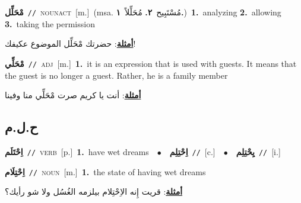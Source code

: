\documentclass[10pt,a4paper,twoside]{article} %
\begin{document}
\begin{multicols}{2}
{\setlength\topsep{0pt}\textbf{\foreignlanguage{arabic}{مْحَلِّل}}\ {\color{gray}\texttt{//}\color{black}}\ \textsc{noun\textunderscore act}\ [m.]\ \color{gray}(msa. \foreignlanguage{arabic}{مُسْتَبِيح}~\foreignlanguage{arabic}{\textbf{٢.}}  \foreignlanguage{arabic}{مُحَلِّلاً}~\foreignlanguage{arabic}{\textbf{١.}})\color{black}\ \textbf{1.}~analyzing  \textbf{2.}~allowing  \textbf{3.}~taking the permission\  \begin{flushright}\color{gray}\foreignlanguage{arabic}{\textbf{\underline{\foreignlanguage{arabic}{أمثلة}}}: حضرتك مْحَلِّل الموضوع عكيفك!}\end{flushright}\color{black}} \vspace{2mm}

{\setlength\topsep{0pt}\textbf{\foreignlanguage{arabic}{مْحَلِّي}}\ {\color{gray}\texttt{//}\color{black}}\ \textsc{adj}\ [m.]\ \textbf{1.}~it is an expression that is used with guests. It means that the guest is no longer a guest. Rather, he is a family member\  \begin{flushright}\color{gray}\foreignlanguage{arabic}{\textbf{\underline{\foreignlanguage{arabic}{أمثلة}}}: أنت يا كريم صرت مْحَلِّي منا وفينا}\end{flushright}\color{black}} \vspace{2mm}

\vspace{-3mm}
\subsection*{\color{blue}\foreignlanguage{arabic}{ح.ل.م}\color{blue}{}} 

{\setlength\topsep{0pt}\textbf{\foreignlanguage{arabic}{اِحْتَلَم}}\ {\color{gray}\texttt{//}\color{black}}\ \textsc{verb}\ [p.]\ \textbf{1.}~have wet dreams\ \ $\bullet$\ \ \setlength\topsep{0pt}\textbf{\foreignlanguage{arabic}{اِحْتِلِم}}\ {\color{gray}\texttt{//}\color{black}}\ [c.]\ \ $\bullet$\ \ \setlength\topsep{0pt}\textbf{\foreignlanguage{arabic}{يِحْتِلِم}}\ {\color{gray}\texttt{//}\color{black}}\ [i.]\ } \vspace{2mm}

{\setlength\topsep{0pt}\textbf{\foreignlanguage{arabic}{اِحْتِلَام}}\ {\color{gray}\texttt{//}\color{black}}\ \textsc{noun}\ [m.]\ \textbf{1.}~the state of having wet dreams\  \begin{flushright}\color{gray}\foreignlanguage{arabic}{\textbf{\underline{\foreignlanguage{arabic}{أمثلة}}}: قريت إِنه الاِحْتِلام بيلزمه الغُسُل ولا شو رأيك؟}\end{flushright}\color{black}} \vspace{2mm}


\end{multicols}
\end{document}

